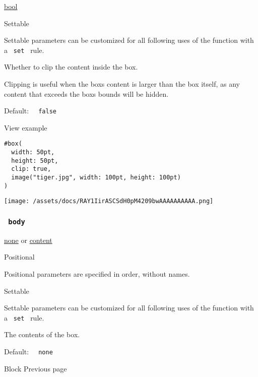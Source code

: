 \href{/docs/reference/foundations/bool/}{bool}

{{ Settable }}

\label{parameters-clip-settable-tooltip}
Settable parameters can be customized for all following uses of the
function with a \texttt{\ set\ } rule.

Whether to clip the content inside the box.

Clipping is useful when the box\textquotesingle s content is larger than
the box itself, as any content that exceeds the box\textquotesingle s
bounds will be hidden.

Default: \texttt{\ }{\texttt{\ false\ }}\texttt{\ }


View example

\begin{verbatim}
#box(
  width: 50pt,
  height: 50pt,
  clip: true,
  image("tiger.jpg", width: 100pt, height: 100pt)
)
\end{verbatim}

\texttt{[image: /assets/docs/RAY1IirASCSdH0pM4209bwAAAAAAAAAA.png]}

\subsubsection{\texorpdfstring{\texttt{\ body\ }}{ body }}\label{parameters-body}

\href{/docs/reference/foundations/none/}{none} {or}
\href{/docs/reference/foundations/content/}{content}

{{ Positional }}

\label{parameters-body-positional-tooltip}
Positional parameters are specified in order, without names.

{{ Settable }}

\label{parameters-body-settable-tooltip}
Settable parameters can be customized for all following uses of the
function with a \texttt{\ set\ } rule.

The contents of the box.

Default: \texttt{\ }{\texttt{\ none\ }}\texttt{\ }

\href{/docs/reference/layout/block/}{\pandocbounded{}}

{ Block } { Previous page }

\href{/docs/reference/layout/colbreak/}{\pandocbounded{}}

